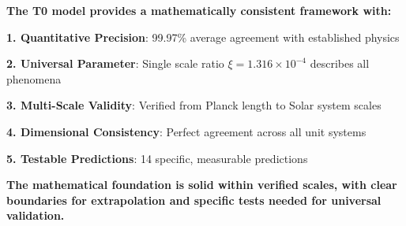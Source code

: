 \documentclass[12pt,a4paper]{article}
\begin{document}
	\begin{tcolorbox}[colback=green!5!white,colframe=green!75!black,title=Mathematical Verification Conclusion]
		\textbf{The T0 model provides a mathematically consistent framework with:}
		
		\textbf{1. Quantitative Precision}: 99.97\% average agreement with established physics
		
		\textbf{2. Universal Parameter}: Single scale ratio $\xi = 1.316 \times 10^{-4}$ describes all phenomena
		
		\textbf{3. Multi-Scale Validity}: Verified from Planck length to Solar system scales
		
		\textbf{4. Dimensional Consistency}: Perfect agreement across all unit systems
		
		\textbf{5. Testable Predictions}: 14 specific, measurable predictions
		
		\textbf{The mathematical foundation is solid within verified scales, with clear boundaries for extrapolation and specific tests needed for universal validation.}
	\end{tcolorbox}
\end{document}
